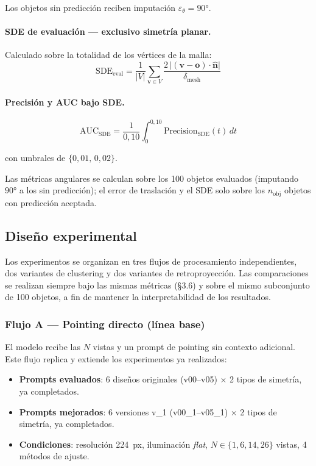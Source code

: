 Los objetos sin predicción reciben imputación $\varepsilon_\theta = 90°$.

\paragraph{SDE de evaluación — exclusivo simetría planar.}
Calculado sobre la totalidad de los vértices de la malla:
\begin{equation}
    \text{SDE}_{\text{eval}} =
    \frac{1}{|V|}\sum_{\mathbf{v}\in V}
    \frac{2\,\bigl|(\mathbf{v}-\mathbf{o})\cdot\hat{\mathbf{n}}\bigr|}
         {\delta_{\text{mesh}}}
    \label{eq:sde_eval}
\end{equation}

\paragraph{Precisión y AUC bajo SDE.}
\begin{equation}
    \text{AUC}_{\text{SDE}} =
    \frac{1}{0{,}10}\int_0^{0{,}10}
        \text{Precision}_{\text{SDE}}(t)\,dt
\end{equation}

con umbrales de $\{0{,}01,\, 0{,}02\}$.

Las métricas angulares se calculan sobre los 100 objetos evaluados (imputando
$90°$ a los sin predicción); el error de traslación y el SDE solo sobre los
$n_{\text{obj}}$ objetos con predicción aceptada.

\newpage
\subsection{Diseño experimental}
\label{Experimentos}

Los experimentos se organizan en tres flujos de procesamiento independientes,
dos variantes de clustering y dos variantes de retroproyección. Las comparaciones
se realizan siempre bajo las mismas métricas (§3.6) y sobre el mismo subconjunto
de 100 objetos, a fin de mantener la interpretabilidad de los resultados.

\subsubsection{Flujo A — Pointing directo (línea base)}

El modelo recibe las $N$ vistas y un prompt de pointing sin contexto adicional.
Este flujo replica y extiende los experimentos ya realizados:

\begin{itemize}
    \item \textbf{Prompts evaluados}: 6 diseños originales (v00--v05) $\times$
          2 tipos de simetría, ya completados.
    \item \textbf{Prompts mejorados}: 6 versiones v\_1 (v00\_1--v05\_1) $\times$
          2 tipos de simetría, ya completados.
    \item \textbf{Condiciones}: resolución 224~px, iluminación \textit{flat},
          $N \in \{1, 6, 14, 26\}$ vistas, 4 métodos de ajuste.
\end{itemize}

